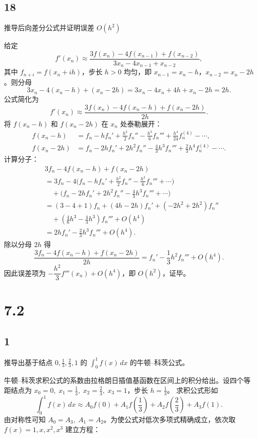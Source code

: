 \documentclass{article}
\begin{document}
\subsection*{18}

推导后向差分公式并证明误差 \(O(h^2)\)

给定
\[
f'(x_n) \approx \frac{3f(x_n) - 4f(x_{n-1}) + f(x_{n-2})}{3x_n - 4x_{n-1} + x_{n-2}},
\]
其中 \(f_{n+i}=f(x_n+ih)\)，步长 \(h>0\) 均匀，即 \(x_{n-1}=x_n-h\)，\(x_{n-2}=x_n-2h\)。则分母
\[
3x_n - 4(x_n-h) + (x_n-2h) = 3x_n -4x_n+4h + x_n -2h = 2h.
\]
公式简化为
\[
f'(x_n) \approx \frac{3f(x_n) - 4f(x_n-h) + f(x_n-2h)}{2h}.
\]
将 \(f(x_n-h)\) 和 \(f(x_n-2h)\) 在 \(x_n\) 处泰勒展开：
\[
\begin{aligned}
f(x_n-h) &= f_n - h f_n' + \frac{h^2}{2}f_n'' - \frac{h^3}{6}f_n''' + \frac{h^4}{24}f_n^{(4)} - \cdots,\\
f(x_n-2h) &= f_n - 2h f_n' + 2h^2 f_n'' - \frac{4}{3}h^3 f_n''' + \frac{2}{3}h^4 f_n^{(4)} - \cdots.
\end{aligned}
\]
计算分子：
\[
\begin{aligned}
&3f_n - 4f(x_n-h) + f(x_n-2h) \\
&= 3f_n -4\bigl(f_n - h f_n' + \frac{h^2}{2}f_n'' - \frac{h^3}{6}f_n''' + \cdots\bigr) \\
&\quad + \bigl(f_n - 2h f_n' + 2h^2 f_n'' - \frac{4}{3}h^3 f_n''' + \cdots\bigr) \\
&= (3-4+1)f_n + (4h -2h)f_n' + (-2h^2+2h^2)f_n'' \\
&\quad + \left(\frac{4}{6}h^3 - \frac{4}{3}h^3\right)f_n''' + O(h^4) \\
&= 2h f_n' - \frac{2}{3}h^3 f_n''' + O(h^4).
\end{aligned}
\]
除以分母 \(2h\) 得
\[
\frac{3f_n - 4f(x_n-h) + f(x_n-2h)}{2h} = f_n' - \frac{1}{3}h^2 f_n''' + O(h^4).
\]
因此误差项为 \(-\dfrac{h^2}{3}f'''(x_n)+O(h^4)\)，即 \(O(h^2)\)，证毕。

\section*{7.2}
\subsection*{1}
推导出基于结点 \(0, \frac13, \frac23, 1\) 的 \(\int_0^1 f(x)\,dx\) 的牛顿–科茨公式。  
  
牛顿–科茨求积公式的系数由拉格朗日插值基函数在区间上的积分给出。设四个等距结点为  
\(x_0=0,\; x_1=\frac13,\; x_2=\frac23,\; x_3=1\)，步长 \(h=\frac13\)。  
求积公式形如  
\[
\int_0^1 f(x)\,dx \approx A_0f(0)+A_1f\!\left(\frac13\right)+A_2f\!\left(\frac23\right)+A_3f(1).
\]  
由对称性可知 \(A_0=A_3,\;A_1=A_2\)。为使公式对低次多项式精确成立，依次取 \(f(x)=1,x,x^2,x^3\) 建立方程：  
\end{document}

